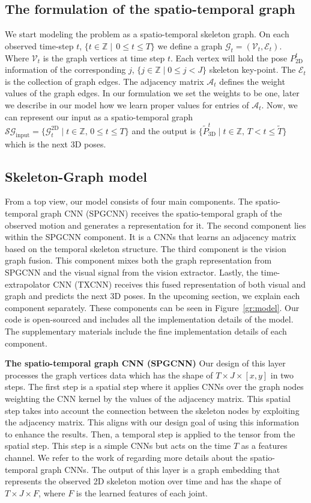 \documentclass[10pt,twocolumn,letterpaper]{article}
\newcommand*{\ours}{Skeleton-Graph }
\begin{document}
\subsection{The formulation of the spatio-temporal graph}
We start modeling the problem as a spatio-temporal skeleton graph. On each observed time-step $t$, $\{t \in \mathbb{Z} \mid\, 0\leq t \leq T\}$ we define a graph $\mathcal{G}_t = \left(\mathcal{V}_t,\mathcal{E}_t\right)$. Where $\mathcal{V}_t$ is the graph vertices at time step $t$. Each vertex will hold the pose $P_\text{2D}^t$ information of the corresponding $j$, $\{j \in \mathbb{Z} \mid 0\leq j < J\}$ skeleton key-point. The $\mathcal{E}_t$ is the collection of graph edges. The adjacency matrix $\mathcal{A}_t$ defines the weight values of the graph edges. In our formulation we set the weights to be one, later we describe in our model how we learn proper values for entries of $\mathcal{A}_t$. 
Now, we can represent our input as a spatio-temporal graph $\mathcal{SG}_\text{input}= \{\mathcal{G}_t^\text{2D}\; |\; t\in \mathbb{Z},\, 0\leq t \leq T  \}$ and the output is $ \{\tilde{P}_\text{3D}^t\; |\; t\in \mathbb{Z},\, T < t \leq \tilde{T} \}$ which is the next 3D poses.

\subsection{\ours model}
From a top view, our model consists of four main components. The spatio-temporal graph CNN (SPGCNN) receives the spatio-temporal graph of the observed motion and generates a representation for it. The second component lies within the SPGCNN component. It is a CNNs that learns an adjacency matrix based on the temporal skeleton structure. The third component is the vision graph fusion. This component mixes both the graph representation from SPGCNN and the visual signal from the vision extractor. Lastly, the time-extrapolator CNN (TXCNN) receives this fused representation of both visual and graph and predicts the next 3D poses. In the upcoming section, we explain each component separately. These components can be seen in Figure~\ref{gr:model}. Our code is open-sourced and includes all the implementation details of the model. The supplementary materials include the fine implementation details of each component. 

\textbf{The spatio-temporal graph CNN (SPGCNN)} Our design of this layer processes the graph vertices data which has the shape of $T\times J \times [x,y]$ in two steps. The first step is a spatial step where it applies CNNs over the graph nodes weighting the CNN kernel by the values of the adjacency matrix. This spatial step takes into account the connection between the skeleton nodes by exploiting the adjacency matrix. This aligns with our design goal of using this information to enhance the results. Then, a temporal step is applied to the tensor from the spatial step. This step is a simple CNNs but acts on the time $T$ as a features channel. We refer to the work of \cite{yan2018spatial} regarding more details about the spatio-temporal graph CNNs. The output of this layer is a graph embedding that represents the observed 2D skeleton motion over time and has the shape of $T\times J \times F$, where $F$ is the learned features of each joint. 
\end{document}

